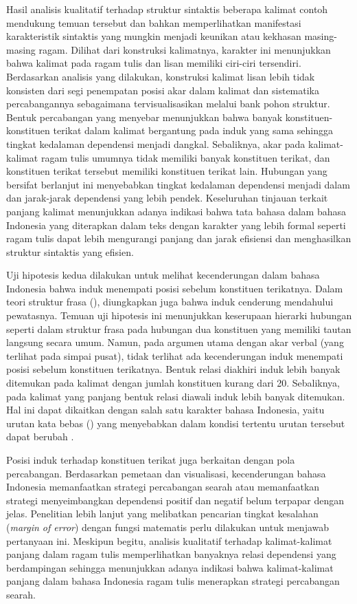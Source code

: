 Hasil analisis kualitatif terhadap struktur sintaktis beberapa kalimat contoh mendukung temuan tersebut dan bahkan memperlihatkan manifestasi karakteristik sintaktis yang mungkin menjadi keunikan atau kekhasan masing-masing ragam. Dilihat dari konstruksi kalimatnya, karakter ini menunjukkan bahwa kalimat pada ragam tulis dan lisan memiliki ciri-ciri tersendiri. Berdasarkan analisis yang dilakukan, konstruksi kalimat lisan lebih tidak konsisten dari segi penempatan posisi akar dalam kalimat dan sistematika percabangannya sebagaimana tervisualisasikan melalui bank pohon struktur. Bentuk percabangan yang menyebar menunjukkan bahwa banyak konstituen-konstituen terikat dalam kalimat bergantung pada induk yang sama sehingga tingkat kedalaman dependensi menjadi dangkal. Sebaliknya, akar pada kalimat-kalimat ragam tulis umumnya tidak memiliki banyak konstituen terikat, dan konstituen terikat tersebut memiliki konstituen terikat lain. Hubungan yang bersifat berlanjut ini menyebabkan tingkat kedalaman dependensi menjadi dalam dan jarak-jarak dependensi yang lebih pendek. Keseluruhan tinjauan terkait panjang kalimat menunjukkan adanya indikasi bahwa tata bahasa dalam bahasa Indonesia yang diterapkan dalam teks dengan karakter yang lebih formal seperti ragam tulis dapat lebih mengurangi panjang dan jarak efisiensi dan menghasilkan struktur sintaktis yang efisien. 

Uji hipotesis kedua dilakukan untuk melihat kecenderungan dalam bahasa Indonesia bahwa induk menempati posisi sebelum konstituen terikatnya. Dalam teori struktur frasa (\citealp{sneddon2010indonesian, kridalaksana2002struktur}), diungkapkan juga bahwa induk cenderung mendahului pewatasnya. Temuan uji hipotesis ini menunjukkan keserupaan hierarki hubungan seperti dalam struktur frasa pada hubungan dua konstituen yang memiliki tautan langsung secara umum. Namun, pada argumen utama dengan akar verbal (yang terlihat pada simpai pusat), tidak terlihat ada kecenderungan induk menempati posisi sebelum konstituen terikatnya. Bentuk relasi diakhiri induk lebih banyak ditemukan pada kalimat dengan jumlah konstituen kurang dari 20. Sebaliknya, pada kalimat yang panjang bentuk relasi diawali induk lebih banyak ditemukan. Hal ini dapat dikaitkan dengan salah satu karakter bahasa Indonesia, yaitu urutan kata bebas (\citealp{stack2005word, postman2004processing}) yang menyebabkan dalam kondisi tertentu urutan tersebut dapat berubah \citep[pp. 209-268]{sneddon2010indonesian}. 

Posisi induk terhadap konstituen terikat juga berkaitan dengan pola percabangan. Berdasarkan pemetaan dan visualisasi, kecenderungan bahasa Indonesia memanfaatkan strategi percabangan searah atau memanfaatkan strategi menyeimbangkan dependensi positif dan negatif belum terpapar dengan jelas. Penelitian lebih lanjut yang melibatkan pencarian tingkat kesalahan (\textit{margin of error}) dengan fungsi matematis perlu dilakukan untuk menjawab pertanyaan ini. Meskipun begitu, analisis kualitatif terhadap kalimat-kalimat panjang dalam ragam tulis memperlihatkan banyaknya relasi dependensi yang berdampingan sehingga menunjukkan adanya indikasi bahwa kalimat-kalimat panjang dalam bahasa Indonesia ragam tulis menerapkan strategi percabangan searah.

